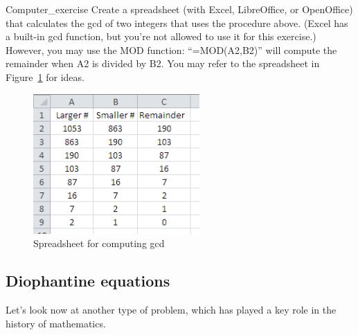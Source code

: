 \begin {exercise}{Computer_exercise} Create a spreadsheet (with  Excel, LibreOffice, or OpenOffice) that calculates the gcd of two integers that uses the procedure above. (Excel has a built-in gcd function, but you're not allowed to use it for this exercise.) However, you may  use the MOD function: ``=MOD(A2,B2)'' will compute the remainder when A2 is divided by B2.  You may refer to the spreadsheet in Figure~\ref{fig:gcd_spreadsheet} for ideas.
\end {exercise}
\begin{figure}[h]
\begin{center}
\includegraphics[width=2.5in]{images/gcd_spreadsheet.png}
\end{center}
\caption{Spreadsheet for computing gcd}\label{fig:gcd_spreadsheet}
\end{figure}


\subsection{Diophantine equations}\label{sec:diophantine}
Let's look now at another type of  problem, which has played a key role in the history of mathematics.


